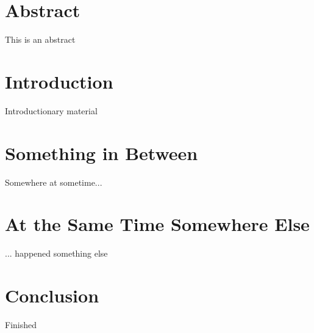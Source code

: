 \documentclass{ituthesis}
\begin{document}

\frontmatter

\thetitlepage
\newpage

\chapter*{Abstract}
This is an abstract

\cleardoublepage
\setcounter{tocdepth}{1}
\tableofcontents

\mainmatter

\midsloppy
\sloppybottom

\chapter{Introduction}
Introductionary material

\chapter{Something in Between}
Somewhere at sometime...

\chapter{At the Same Time Somewhere Else}
... happened something else

\chapter{Conclusion}
Finished
\end{document}
